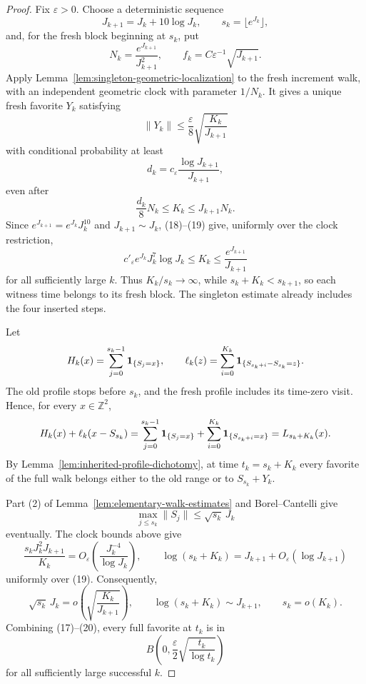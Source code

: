 \begin{proof}
Fix \(\varepsilon>0\).  Choose a deterministic sequence
\[
       J_{k+1}=J_k+10\log J_k,\qquad s_k=\lfloor e^{J_k}\rfloor,
\]
and, for the fresh block beginning at \(s_k\), put
\[
       N_k=\frac{e^{J_{k+1}}}{J_{k+1}^2},\qquad
       f_k=C\varepsilon^{-1}\sqrt{J_{k+1}}.
\]
Apply Lemma~\ref{lem:singleton-geometric-localization} to the fresh increment
walk, with an independent geometric clock with parameter $1/N_k$.  It gives a
unique fresh favorite \(Y_k\) satisfying
\begin{equation}
\lVert Y_k\rVert\le\frac{\varepsilon}{8}
             \sqrt{\frac{K_k}{J_{k+1}}}                       \tag{17}
\end{equation}
with conditional probability at least
\begin{equation}
d_k=c_\varepsilon\frac{\log J_{k+1}}{J_{k+1}},          \tag{18}
\end{equation}
even after
\begin{equation}
\frac{d_k}{8}N_k\le K_k\le J_{k+1}N_k.                 \tag{19}
\end{equation}
Since $e^{J_{k+1}}=e^{J_k}J_k^{10}$ and $J_{k+1}\sim J_k$,
(18)--(19) give, uniformly over the clock restriction,
\[
 c'_{\varepsilon}e^{J_k}J_k^7\log J_k
 \le K_k\le\frac{e^{J_{k+1}}}{J_{k+1}}
\]
for all sufficiently large $k$.  Thus $K_k/s_k\to\infty$, while
$s_k+K_k<s_{k+1}$, so each witness time belongs to its fresh block.
The singleton estimate already includes the four inserted steps.

Let
\[
 H_k(x)=\sum_{j=0}^{s_k-1}{\bf1}_{\{S_j=x\}},\qquad
 \ell_k(z)=\sum_{i=0}^{K_k}
       {\bf1}_{\{S_{s_k+i}-S_{s_k}=z\}}.
\]
The old profile stops before $s_k$, and the fresh profile includes its
time-zero visit.  Hence, for every $x\in\mathbb Z^2$,
\[
 H_k(x)+\ell_k(x-S_{s_k})
 =\sum_{j=0}^{s_k-1}{\bf1}_{\{S_j=x\}}
   +\sum_{i=0}^{K_k}{\bf1}_{\{S_{s_k+i}=x\}}
 =L_{s_k+K_k}(x).
\]
By
Lemma~\ref{lem:inherited-profile-dichotomy}, at time
\(t_k=s_k+K_k\) every favorite of the full walk belongs either to the old
range or to \(S_{s_k}+Y_k\).

Part (2) of Lemma~\ref{lem:elementary-walk-estimates} and Borel--Cantelli give
\[
       \max_{j\le s_k}\lVert S_j\rVert
       \le \sqrt{s_k}\,J_k
\]
eventually.  The clock bounds above give
\[
 \frac{s_kJ_k^2J_{k+1}}{K_k}
 =O_{\varepsilon}\left(\frac{J_k^{-4}}{\log J_k}\right),
 \qquad
 \log(s_k+K_k)=J_{k+1}+O_{\varepsilon}(\log J_{k+1})
\]
uniformly over (19).  Consequently,
\begin{equation}
\sqrt{s_k}\,J_k=o\left(\sqrt{\frac{K_k}{J_{k+1}}}\right),
 \qquad \log(s_k+K_k)\sim J_{k+1},\qquad s_k=o(K_k).            \tag{20}
\end{equation}
Combining (17)--(20), every full favorite at \(t_k\) is in
\begin{equation}
B\left(0,\frac{\varepsilon}{2}
                    \sqrt{\frac{t_k}{\log t_k}}\right)        \tag{21}
\end{equation}
for all sufficiently large successful \(k\).


\end{proof}
